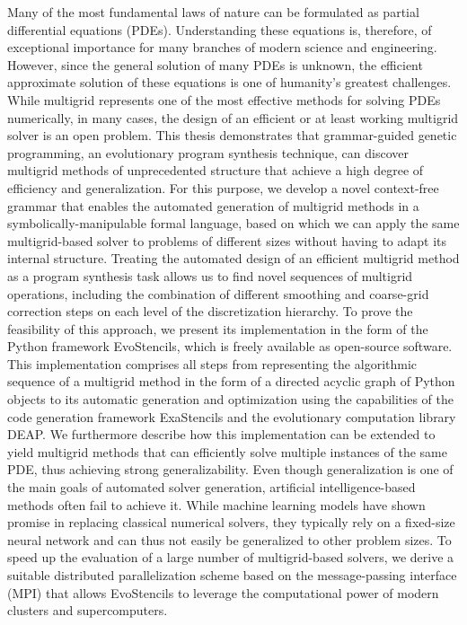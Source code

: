 Many of the most fundamental laws of nature can be formulated as partial differential equations (PDEs). 
Understanding these equations is, therefore, of exceptional importance for many branches of modern science and engineering. 
However, since the general solution of many PDEs is unknown, the efficient approximate solution of these equations is one of humanity's greatest challenges.
While multigrid represents one of the most effective methods for solving PDEs numerically, in many cases, the design of an efficient or at least working multigrid solver is an open problem.
This thesis demonstrates that grammar-guided genetic programming, an evolutionary program synthesis technique, can discover multigrid methods of unprecedented structure that achieve a high degree of efficiency and generalization.
For this purpose, we develop a novel context-free grammar that enables the automated generation of multigrid methods in a symbolically-manipulable formal language, based on which we can apply the same multigrid-based solver to problems of different sizes without having to adapt its internal structure.
Treating the automated design of an efficient multigrid method as a program synthesis task allows us to find novel sequences of multigrid operations, including the combination of different smoothing and coarse-grid correction steps on each level of the discretization hierarchy.
To prove the feasibility of this approach, we present its implementation in the form of the Python framework EvoStencils, which is freely available as open-source software.
This implementation comprises all steps from representing the algorithmic sequence of a multigrid method in the form of a directed acyclic graph of Python objects to its automatic generation and optimization using the capabilities of the code generation framework ExaStencils and the evolutionary computation library DEAP.
We furthermore describe how this implementation can be extended to yield multigrid methods that can efficiently solve multiple instances of the same PDE, thus achieving strong generalizability.
Even though generalization is one of the main goals of automated solver generation, artificial intelligence-based methods often fail to achieve it. 
While machine learning models have shown promise in replacing classical numerical solvers, they typically rely on a fixed-size neural network and can thus not easily be generalized to other problem sizes.
To speed up the evaluation of a large number of multigrid-based solvers, we derive a suitable distributed parallelization scheme based on the message-passing interface (MPI) that allows EvoStencils to leverage the computational power of modern clusters and supercomputers.

